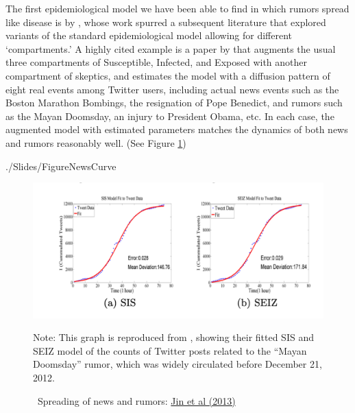 The first epidemiological model we have been able to find in which rumors spread like disease is by \cite{daley1964epidemics},  whose work spurred a subsequent literature that explored variants of the standard epidemiological model allowing for different `compartments.'  A highly cited example is a paper by \cite{jin2013epidemiological} that augments the usual three compartments of Susceptible, Infected, and Exposed with another compartment of skeptics, and estimates the model with a diffusion pattern of eight real events among Twitter users, including actual news events such as the Boston Marathon Bombings, the resignation of Pope Benedict, and rumors such as the Mayan Doomsday, an injury to President Obama, etc.  In each case, the augmented model with estimated parameters matches the dynamics of both news and rumors reasonably well. (See Figure \ref{fig:news_curve})






\begin{verbatimwrite}{./Slides/FigureNewsCurve}
	\begin{figure}[!ht] \centering  %
		\caption{ ~Spreading of news and rumors: \href{https://people.cs.vt.edu/ramakris/papers/news-rumor-epi-snakdd13.pdf}{Jin et al (2013)}}\nocite{jin2013epidemiological}
		\label{fig:news_curve}
		\centerline{\includegraphics[width=\textwidth]{./figures/Doomsday}}
		\begin{flushleft}{\footnotesize Note: This graph is reproduced from \cite{jin2013epidemiological}, showing their fitted SIS and SEIZ model of the counts of Twitter posts related to the ``Mayan Doomsday'' rumor, which was widely circulated before December 21, 2012.}
		\end{flushleft}
	\end{figure}
\end{verbatimwrite}%

